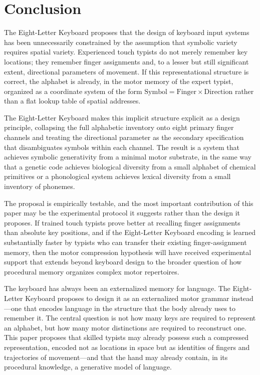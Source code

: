 \documentclass[12pt,a4paper]{article}
\theoremstyle{plain}
\theoremstyle{definition}
\theoremstyle{remark}
\begin{document}
\section{Conclusion}

The Eight-Letter Keyboard proposes that the design of keyboard input systems
has been unnecessarily constrained by the assumption that symbolic variety
requires spatial variety. Experienced touch typists do not merely remember key
locations; they remember finger assignments and, to a lesser but still
significant extent, directional parameters of movement. If this representational
structure is correct, the alphabet is already, in the motor memory of the expert
typist, organized as a coordinate system of the form $\text{Symbol} = \text{Finger}
\times \text{Direction}$ rather than a flat lookup table of spatial addresses.

The Eight-Letter Keyboard makes this implicit structure explicit as a design
principle, collapsing the full alphabetic inventory onto eight primary finger
channels and treating the directional parameter as the secondary specification
that disambiguates symbols within each channel. The result is a system that
achieves symbolic generativity from a minimal motor substrate, in the same way
that a genetic code achieves biological diversity from a small alphabet of
chemical primitives or a phonological system achieves lexical diversity from a
small inventory of phonemes.

The proposal is empirically testable, and the most important contribution of
this paper may be the experimental protocol it suggests rather than the design
it proposes. If trained touch typists prove better at recalling finger
assignments than absolute key positions, and if the Eight-Letter Keyboard
encoding is learned substantially faster by typists who can transfer their
existing finger-assignment memory, then the motor compression hypothesis will
have received experimental support that extends beyond keyboard design to the
broader question of how procedural memory organizes complex motor repertoires.

The keyboard has always been an externalized memory for language. The
Eight-Letter Keyboard proposes to design it as an externalized motor grammar
instead---one that encodes language in the structure that the body already uses
to remember it. The central question is not how many keys are required to
represent an alphabet, but how many motor distinctions are required to
reconstruct one. This paper proposes that skilled typists may already possess
such a compressed representation, encoded not as locations in space but as
identities of fingers and trajectories of movement---and that the hand may
already contain, in its procedural knowledge, a generative model of language.
\end{document}
